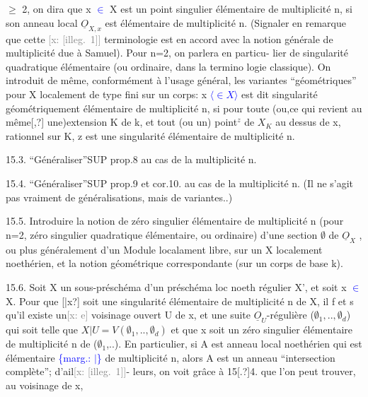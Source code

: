 \documentclass[11pt]{article}
\newcommand{\scanpage}[1]{\par\bigskip\noindent{\small\sffamily[scan #1]}\par}
\newcommand{\mspage}[1]{{\small\sffamily[p.\,#1]}}
\newcommand{\hand}[1]{\textcolor{blue}{#1}}
\let\over\relax
\newcommand{\over}[2]{\textcolor{gray}{#1}\textcolor{blue}{\ensuremath{^{\!\nearrow}}#2}}
\newcommand{\inserted}[2][]{\textcolor{blue}{$\langle$#2$\rangle$}}
\newcommand{\margin}[1]{\textcolor{blue}{\{\textsf{marg.:} #1\}}}
\newcommand{\xout}[1]{\textcolor{gray}{[\textsf{x:} #1]}}
\newcommand{\unsure}[1]{[#1?]}
\newcommand{\illegible}[1]{[\textsf{illeg.\ #1}]}
\begin{document}
$\geqslant$ 2, on dira que x \hand{$\in$} X est un point singulier élémentaire de multiplicité
n, si son anneau local $\underline{O}_{X,x}$ est élémentaire de multiplicité n. (Signaler
en remarque que cette \xout{\illegible{1}} terminologie est en accord avec la notion
générale de multiplicité due à Samuel). Pour n=2, on parlera en particu-%
lier de singularité quadratique élémentaire (ou ordinaire, dans la termino
logie classique). On introduit de même, conformément à l'usage général,
les variantes ``géométriques'' pour X localement de type fini sur un corps:
x \inserted{$\in X$} est dit singularité géométriquement élémentaire de multiplicité n, si
pour toute (ou,ce qui revient au même\unsure{,} une)extension K de k, et tout
(ou un) point$^{z}$ de $X_{K}$ au dessus de x, rationnel sur K, z est une
singularité élémentaire de multiplicité n.

15.3. ``Généraliser''SUP prop.8 au cas de la multiplicité n.

15.4. ``Généraliser''SUP prop.9 et cor.10. au cas de la multiplicité n.
(Il ne s'agit pas vraiment de généralisations, mais de variantes..)

15.5. Introduire la notion de zéro singulier élémentaire de multiplicité
n (pour n=2, zéro singulier quadratique élémentaire, ou ordinaire) d'une
section $\emptyset$ de $\underline{O}_{X}$ , ou plus généralement d'un Module localament libre, sur
un X localement noethérien, et la notion géométrique correspondante
(sur un corps de base k).

15.6. Soit X un sous-préschéma d'un préschéma loc noeth régulier X', et
soit x \hand{$\in$}X. Pour que \unsure{\over{X}{x}|x} soit une singularité élémentaire de multiplicité
n de X, il f et s qu'il existe un\xout{e} voisinage ouvert U de x, et une
suite $\underline{O}_{U}$-régulière ($\emptyset_{1},..,\emptyset_{d}$) qui soit telle que $X|U = V(\emptyset_{1},..,\emptyset_{d})$ et
que x soit un zéro singulier élémentaire de multiplicité n de ($\emptyset_{1}$,..).
En particulier, si A est anneau local noethérien qui est élémentaire
\margin{$|$} de multiplicité n, alors A est un anneau ``intersection complète''; d'ail\xout{\illegible{1}}-%
leurs, on voit grâce à 15\unsure{.}4. que l'on peut trouver, au voisinage de x,

\mspage{162}

\clearpage
\scanpage{25/163}
\mspage{\hand{6}}
\end{document}

